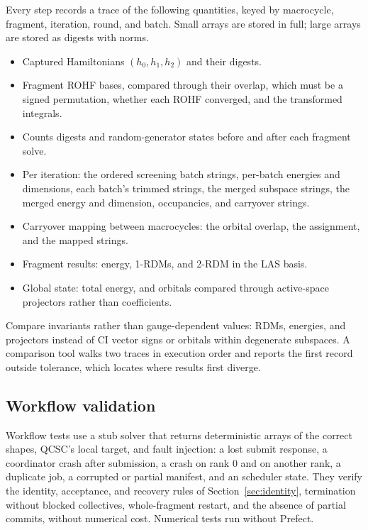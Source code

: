 \documentclass[11pt,a4paper]{article}
\newcommand{\code}[1]{\texttt{\detokenize{#1}}}
\begin{document}
Every step records a trace of the following quantities, keyed by macrocycle,
fragment, iteration, round, and batch. Small arrays are stored in full; large arrays are
stored as digests with norms.
\begin{itemize}
  \item Captured Hamiltonians $(h_0, h_1, h_2)$ and their digests.
  \item Fragment ROHF bases, compared through their overlap, which must be a
  signed permutation, whether each ROHF converged, and the transformed
  integrals.
  \item Counts digests and random-generator states before and after each
  fragment solve.
  \item Per iteration: the ordered screening batch strings, per-batch energies
  and dimensions, each batch's trimmed strings, the merged subspace strings,
  the merged energy and dimension, occupancies, and carryover strings.
  \item Carryover mapping between macrocycles: the orbital overlap, the
  assignment, and the mapped strings.
  \item Fragment results: energy, 1-RDMs, and 2-RDM in the LAS basis.
  \item Global state: total energy, and orbitals compared through active-space
  projectors rather than coefficients.
\end{itemize}
Compare invariants rather than gauge-dependent values: RDMs, energies, and
projectors instead of CI vector signs or orbitals within degenerate subspaces.
A comparison tool walks two traces in execution order and reports the first
record outside tolerance, which locates where results first diverge.

\subsection{Workflow validation}

Workflow tests use a stub solver that returns deterministic arrays of the
correct shapes, QCSC's local target, and fault injection: a lost submit
response, a coordinator crash after submission, a crash on rank 0 and on
another rank, a duplicate job, a corrupted or partial manifest, and an
\code{UNKNOWN} scheduler state. They verify the identity, acceptance, and
recovery rules of Section~\ref{sec:identity}, termination without blocked
collectives, whole-fragment restart, and the absence of partial commits,
without numerical cost. Numerical tests run without Prefect.
\end{document}
